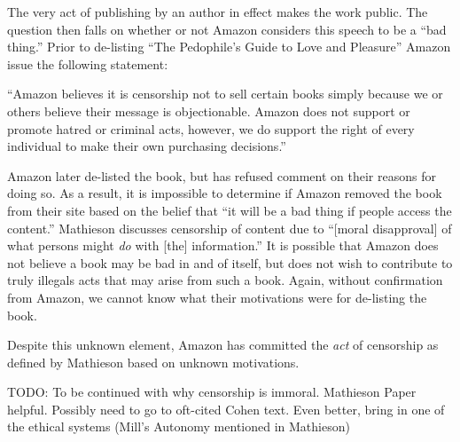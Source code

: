 \documentclass[11pt]{article}
\begin{document}
\begin{multicols}{2}
The very act of publishing by an author in effect makes the work public.  The question then falls on whether or not Amazon considers this speech to be a ``bad thing.''  Prior to de-listing ``The Pedophile's Guide to Love and Pleasure'' Amazon issue the following statement:

``Amazon believes it is censorship not to sell certain books simply because we or others believe their message is objectionable.  Amazon does not support or promote hatred or criminal acts, however, we do support the right of every individual to make their own purchasing decisions.'' \cite{TechCrunchAmazonCensorship}

Amazon later de-listed the book, but has refused comment on their reasons for doing so.  As a result, it is impossible to determine if Amazon removed the book from their site based on the belief that ``it will be a bad thing if people access the content.''  Mathieson discusses censorship of content due to ``[moral disapproval] of what persons might \emph{do} with [the] information.'' \cite{MathiesenCensorship}  It is possible that Amazon does not believe a book may be bad in and of itself, but does not wish to contribute to truly illegals acts that may arise from such a book.  Again, without confirmation from Amazon, we cannot know what their motivations were for de-listing the book.

Despite this unknown element, Amazon has committed the \emph{act} of censorship as defined by Mathieson based on unknown motivations.

TODO: To be continued with why censorship is immoral. Mathieson Paper helpful.  Possibly need to go to oft-cited Cohen text. Even better, bring in one of the ethical systems (Mill's Autonomy mentioned in Mathieson)


\end{multicols}
\end{document}
